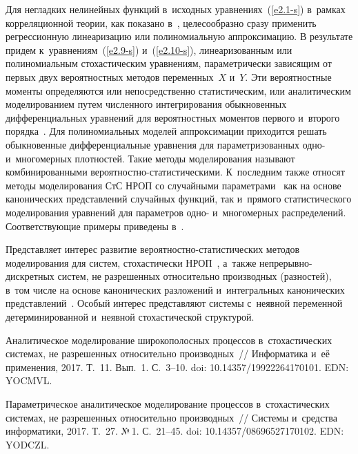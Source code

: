 \begin{multicols}{2}
Для негладких нелинейных функций в~исходных уравнениях~(\ref{e2.1-s}) в~рамках 
корреляционной тео\-рии, как показано в~\cite{3-s, 4-s, 5-s, 6-s}, целесообразно сразу применить 
регрессионную линеаризацию или полиномиальную аппроксимацию. В результате придем к~уравнениям~(\ref{e2.9-s}) и~(\ref{e2.10-s}), линеаризованным или полиномиальным стохастическим 
уравнениям, параметрически зависящим от первых двух вероятностных методов 
переменных~$X$ и~$Y$. Эти вероятностные моменты определяются или непосредственно 
статистическим, или аналитическим моделированием путем численного интегрирования 
обыкновенных дифференциальных уравнений для вероятностных моментов первого 
и~второго порядка~\cite{2-s, 11-s, 12-s}. Для полиномиальных моделей аппроксимации приходится 
решать обыкновенные дифференциальные уравнения для параметризованных одно- и~многомерных плотностей. Такие методы моделирования называют комбинированными 
ве\-ро\-ят\-ност\-но-ста\-ти\-сти\-че\-ски\-ми. К~последним также относят методы моделирования СтС 
НРОП со случайными па\-ра\-мет\-ра\-ми~\cite{7-s} как на основе канонических представлений 
случайных функций, так и~прямого статистического моделирования уравнений для 
параметров одно- и~многомерных распределений. Со\-от\-вет\-ст\-ву\-ющие примеры приведены 
в~\cite{7-s}.

Представляет интерес развитие ве\-ро\-ят\-ност\-но-ста\-ти\-сти\-че\-ских методов моделирования 
для сис\-тем, стохастически НРОП~\cite{5-s}, а~также 
не\-пре\-рыв\-но-дис\-крет\-ных сис\-тем, не разрешенных относительно производных 
(разностей), в~том числе на основе канонических разложений и~интегральных 
канонических представлений~\cite{12-s}. Особый интерес представляют системы с~неявной 
переменной детерминированной и~неявной стохастической структурой.

{\small\frenchspacing
 {\baselineskip=10.8pt
 \begin{thebibliography}{99}    
Аналитическое моделирование широкополосных процессов в~стохастических системах, 
не разрешенных относительно производных~// Информатика и~её применения, 2017. 
Т.~11. Вып.~1. С.~3--10. doi: 10.14357/19922264170101. EDN: YOCMVL.

Параметрическое аналитическое моделирование процессов в~стохастических  
системах, не разрешенных относительно производных~// Системы и~средства 
информатики, 2017. Т.~27. №\,1. С.~21--45. doi: 10.14357/08696527170102. EDN: YODCZL.


\end{thebibliography}}}
\end{multicols}
